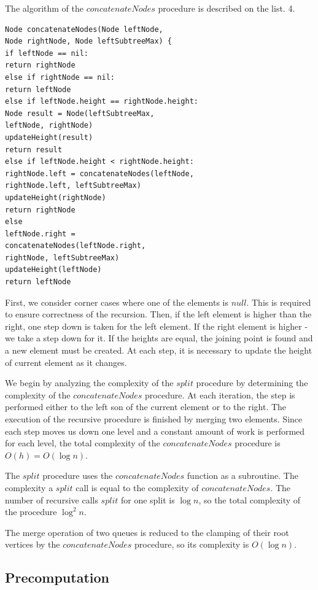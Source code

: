 \documentclass[conference]{IEEEtran}
\theoremstyle{plane}
\begin{document}
The algorithm of the $concatenateNodes$ procedure is described on the list. 4.

\begin{lstlisting}[caption={Merging two queues using heights},captionpos=b]
Node concatenateNodes(Node leftNode, 
Node rightNode, Node leftSubtreeMax) {
if leftNode == nil:
return rightNode
else if rightNode == nil: 
return leftNode
else if leftNode.height == rightNode.height:
Node result = Node(leftSubtreeMax, 
leftNode, rightNode)
updateHeight(result)
return result
else if leftNode.height < rightNode.height:
rightNode.left = concatenateNodes(leftNode, 
rightNode.left, leftSubtreeMax)
updateHeight(rightNode)
return rightNode
else
leftNode.right = 
concatenateNodes(leftNode.right, 
rightNode, leftSubtreeMax)
updateHeight(leftNode)
return leftNode
\end{lstlisting}

First, we consider corner cases where one of the elements is $null$. This is required to ensure correctness of the recursion. Then, if the left element is higher than the right, one step down is taken for the left element. If the right element is higher - we take a step down for it. If the heights are equal, the joining point is found and a new element must be created. At each step, it is necessary to update the height of current element as it changes.

We begin by analyzing the complexity of the $split$ procedure by determining the complexity of the $concatenateNodes$ procedure. At each iteration, the step is performed either to the left son of the current element or to the right. The execution of the recursive procedure is finished by merging two elements. Since each step moves us down one level and a constant amount of work is performed for each level, the total complexity of the $concatenateNodes$ procedure is $O(h)=O(\log n)$.

The $split$ procedure uses the $concatenateNodes$ function as a subroutine. The complexity a $split$ call is equal to the complexity of $concatenateNodes$. The number of recursive calls $split$ for one split is $\log n$, so the total complexity of the procedure $\log^2 n$.

The merge operation of two queues is reduced to the clamping of their root vertices by the $concatenateNodes$ procedure, so its complexity is $O(\log n)$.

\subsection{Precomputation}
\end{document}
